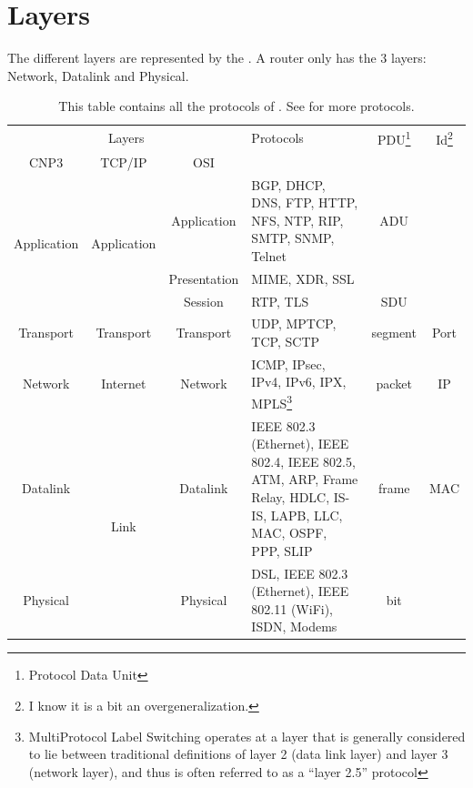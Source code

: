\section{Layers}

The different layers are represented by the .
A router only has the 3 layers: Network, Datalink and Physical.
\begin{table}[!ht]
  \centering
  \begin{tabular}{|c|c|c|p{4cm}|c|c|}
    \hline
    \multicolumn{3}{|c|}{Layers} & Protocols & PDU\footnote{Protocol Data Unit} & Id\footnote{I know it is a bit an overgeneralization.}\\
    \cline{1-3}
    CNP3 & TCP/IP & OSI & & & \\
    \hline
    \multirow{3}{*}{Application} & \multirow{3}{*}{Application}             & Application  & BGP, DHCP, DNS, FTP, HTTP, NFS, NTP, RIP, SMTP, SNMP, Telnet & ADU & \\
    \cline{3-6}
                                 &                                          & Presentation & MIME, XDR, SSL & & \\
    \cline{3-6}
                                 &                                          & Session      & RTP, TLS & SDU & \\
    \hline
    Transport                    & Transport                                & Transport    & UDP, MPTCP, TCP, SCTP & segment & Port\\
    \hline
    Network                      & Internet                                 & Network      & ICMP, IPsec, IPv4, IPv6, IPX, MPLS\footnote{MultiProtocol Label Switching operates at a layer that is generally considered to lie between traditional definitions of layer 2 (data link layer) and layer 3 (network layer), and thus is often referred to as a ``layer 2.5'' protocol} & packet & IP\\
    \hline
    Datalink                     & \multirow{2}{*}{Link}                    & Datalink     & IEEE 802.3 (Ethernet), IEEE 802.4, IEEE 802.5, ATM, ARP, Frame Relay, HDLC, IS-IS, LAPB, LLC, MAC, OSPF, PPP, SLIP & frame & MAC\\
    \cline{1-1}
    \cline{3-6}
    Physical                     &                                          & Physical     & DSL, IEEE 802.3 (Ethernet), IEEE 802.11 (WiFi), ISDN, Modems & bit & \\
    \hline
  \end{tabular}
  \caption{This table contains all the protocols of \cite{bonaventure2011computer}. See \cite{wiki:osimodel} for more protocols.}
  \label{tab:layers}
\end{table}

